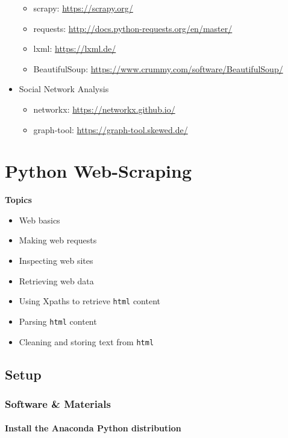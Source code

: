 \documentclass[]{book}
\providecommand{\tightlist}{%
  \setlength{\itemsep}{0pt}\setlength{\parskip}{0pt}}
\begin{document}
\begin{itemize}
  \begin{itemize}
  \tightlist
  \item
    scrapy: \url{https://scrapy.org/}
  \item
    requests: \url{http://docs.python-requests.org/en/master/}
  \item
    lxml: \url{https://lxml.de/}
  \item
    BeautifulSoup: \url{https://www.crummy.com/software/BeautifulSoup/}
  \end{itemize}
\item
  Social Network Analysis

  \begin{itemize}
  \tightlist
  \item
    networkx: \url{https://networkx.github.io/}
  \item
    graph-tool: \url{https://graph-tool.skewed.de/}
  \end{itemize}
\end{itemize}

\chapter{Python Web-Scraping}\label{python-web-scraping}

\textbf{Topics}

\begin{itemize}
\tightlist
\item
  Web basics
\item
  Making web requests
\item
  Inspecting web sites
\item
  Retrieving web data
\item
  Using Xpaths to retrieve \texttt{html} content
\item
  Parsing \texttt{html} content
\item
  Cleaning and storing text from \texttt{html}
\end{itemize}

\section{Setup}\label{setup-5}

\subsection{Software \& Materials}\label{software-materials-5}

\subsubsection{Install the Anaconda Python
distribution}\label{install-the-anaconda-python-distribution-1}
\end{document}
